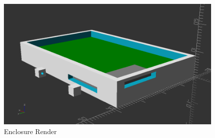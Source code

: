 
\begin{landscape}

\begin{figure}[!htb]
\centering
\includegraphics[width=\paperwidth,keepaspectratio]{images/enclosure.png}
\caption{Enclosure Render}
\label{fig:enclosure}
\end{figure}

\end{landscape}
